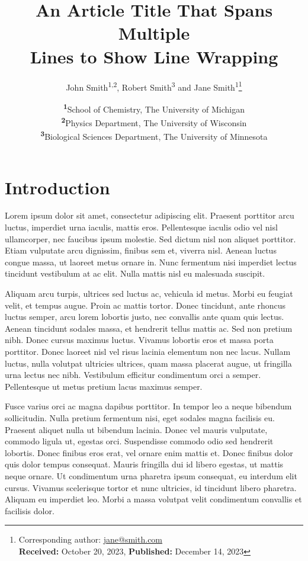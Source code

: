 \documentclass[
	a4paper, %
	10pt, %
	unnumberedsections, %
	twoside, %
]{LTJournalArticle}
\title{An Article Title That Spans Multiple\\ Lines to Show Line Wrapping} %
\author{%
	John Smith\textsuperscript{1,2}, Robert Smith\textsuperscript{3} and Jane Smith\textsuperscript{1}\thanks{Corresponding author: \href{mailto:jane@smith.com}{jane@smith.com}\\ \textbf{Received:} October 20, 2023, \textbf{Published:} December 14, 2023}
}
\date{\footnotesize\textsuperscript{\textbf{1}}School of Chemistry, The University of Michigan\\ \textsuperscript{\textbf{2}}Physics Department, The University of Wisconsin\\ \textsuperscript{\textbf{3}}Biological Sciences Department, The University of Minnesota}
\begin{document}
\maketitle %


\section{Introduction}

Lorem ipsum dolor sit amet, consectetur adipiscing elit. Praesent porttitor arcu luctus, imperdiet urna iaculis, mattis eros. Pellentesque iaculis odio vel nisl ullamcorper, nec faucibus ipsum molestie. Sed dictum nisl non aliquet porttitor. Etiam vulputate arcu dignissim, finibus sem et, viverra nisl. Aenean luctus congue massa, ut laoreet metus ornare in. Nunc fermentum nisi imperdiet lectus tincidunt vestibulum at ac elit. Nulla mattis nisl eu malesuada suscipit.

Aliquam arcu turpis, ultrices sed luctus ac, vehicula id metus. Morbi eu feugiat velit, et tempus augue. Proin ac mattis tortor. Donec tincidunt, ante rhoncus luctus semper, arcu lorem lobortis justo, nec convallis ante quam quis lectus. Aenean tincidunt sodales massa, et hendrerit tellus mattis ac. Sed non pretium nibh. Donec cursus maximus luctus. Vivamus lobortis eros et massa porta porttitor. Donec laoreet nisl vel risus lacinia elementum non nec lacus. Nullam luctus, nulla volutpat ultricies ultrices, quam massa placerat augue, ut fringilla urna lectus nec nibh. Vestibulum efficitur condimentum orci a semper. Pellentesque ut metus pretium lacus maximus semper.

Fusce varius orci ac magna dapibus porttitor. In tempor leo a neque bibendum sollicitudin. Nulla pretium fermentum nisi, eget sodales magna facilisis eu. Praesent aliquet nulla ut bibendum lacinia. Donec vel mauris vulputate, commodo ligula ut, egestas orci. Suspendisse commodo odio sed hendrerit lobortis. Donec finibus eros erat, vel ornare enim mattis et. Donec finibus dolor quis dolor tempus consequat. Mauris fringilla dui id libero egestas, ut mattis neque ornare. Ut condimentum urna pharetra ipsum consequat, eu interdum elit cursus. Vivamus scelerisque tortor et nunc ultricies, id tincidunt libero pharetra. Aliquam eu imperdiet leo. Morbi a massa volutpat velit condimentum convallis et facilisis dolor.
\end{document}
